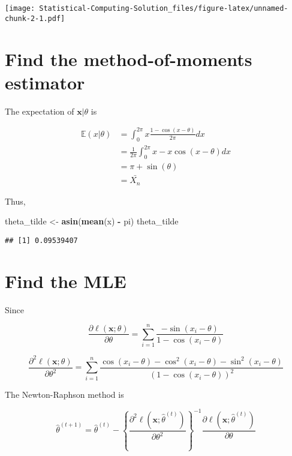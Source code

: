 \documentclass[]{book}
\newenvironment{Shaded}{\begin{snugshade}}{\end{snugshade}}
\newcommand{\KeywordTok}[1]{\textcolor[rgb]{0.13,0.29,0.53}{\textbf{#1}}}
\newcommand{\StringTok}[1]{\textcolor[rgb]{0.31,0.60,0.02}{#1}}
\newcommand{\OperatorTok}[1]{\textcolor[rgb]{0.81,0.36,0.00}{\textbf{#1}}}
\newcommand{\NormalTok}[1]{#1}
\theoremstyle{definition}
\theoremstyle{definition}
\theoremstyle{definition}
\theoremstyle{remark}
\begin{document}
\texttt{[image: Statistical-Computing-Solution\_files/figure-latex/unnamed-chunk-2-1.pdf]}

\section{Find the method-of-moments
estimator}\label{find-the-method-of-moments-estimator}

The expectation of \(\mathbf{x}|\theta\) is

\begin{align*}
\mathbb E (x | \theta) &= \int_{0}^{2\pi} x \frac{1-\cos(x-\theta)}{2\pi} dx \\
&= \frac{1}{2\pi} \int_{0}^{2\pi} x - x\cos(x-\theta) dx \\
&= \pi + \sin(\theta) \\
&= \bar{X_n}
\end{align*}

Thus,

\begin{Shaded}
\begin{Highlighting}[]
\NormalTok{theta_tilde <-}\StringTok{ }\KeywordTok{asin}\NormalTok{(}\KeywordTok{mean}\NormalTok{(x) }\OperatorTok{-}\StringTok{ }\NormalTok{pi)}
\NormalTok{theta_tilde}
\end{Highlighting}
\end{Shaded}

\begin{verbatim}
## [1] 0.09539407
\end{verbatim}

\section{Find the MLE}\label{find-the-mle}

Since

\[\frac{\partial\ell(\mathbf{x}; \theta)}{\partial\theta} = \sum_{i=1}^n \frac{-\sin(x_i - \theta)}{1-\cos(x_i-\theta)}\]

\[\frac{\partial^2\ell(\mathbf{x}; \theta)}{\partial \theta^2} = \sum_{i=1}^n \frac{\cos(x_i-\theta) - \cos^2(x_i-\theta)-\sin^2(x_i-\theta)}{(1-\cos(x_i-\theta))^2}\]

The Newton-Raphson method is

\[\hat\theta^{(t+1)} = \hat\theta^{(t)} - \left\{\frac{\partial^2\ell(\mathbf{x}; \hat\theta^{(t)})}{\partial \theta^2}\right\}^{-1}\frac{\partial\ell(\mathbf{x}; \hat\theta^{(t)})}{\partial\theta}\]
\end{document}
